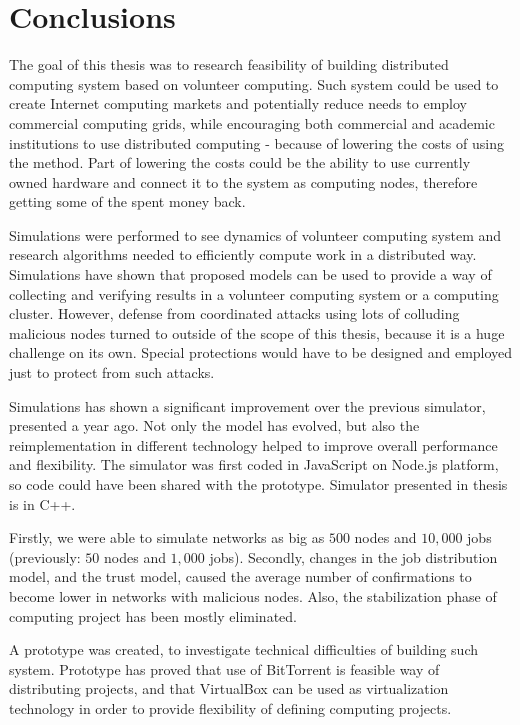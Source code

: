 \chapter{Conclusions}

The goal of this thesis was to research feasibility of building distributed computing system based on volunteer computing. Such system could be used to create Internet computing markets and potentially reduce needs to employ commercial computing grids, while encouraging both commercial and academic institutions to use distributed computing - because of lowering the costs of using the method. Part of lowering the costs could be the ability to use currently owned hardware and connect it to the system as computing nodes, therefore getting some of the spent money back.

Simulations were performed to see dynamics of volunteer computing system and research algorithms needed to efficiently compute work in a distributed way. Simulations have shown that proposed models can be used to provide a way of collecting and verifying results in a volunteer computing system or a computing cluster. However, defense from coordinated attacks using lots of colluding malicious nodes turned to outside of the scope of this thesis, because it is a huge challenge on its own. Special protections would have to be designed and employed just to protect from such attacks.

Simulations has shown a significant improvement over the previous simulator, presented a year ago\cite{zochniakreliable}. Not only the model has evolved, but also the reimplementation in different technology helped to improve overall performance and flexibility. The simulator was first coded in JavaScript on Node.js platform, so code could have been shared with the prototype. Simulator presented in thesis is in C++.

Firstly, we were able to simulate networks as big as $500$ nodes and $10,000$ jobs (previously: $50$ nodes and $1,000$ jobs). Secondly, changes in the job distribution model, and the trust model, caused the average number of confirmations to become lower in networks with malicious nodes. Also, the stabilization phase of computing project has been mostly eliminated.

A prototype was created, to investigate technical difficulties of building such system. Prototype has proved that use of BitTorrent is feasible way of distributing projects, and that VirtualBox can be used as virtualization technology in order to provide flexibility of defining computing projects.

